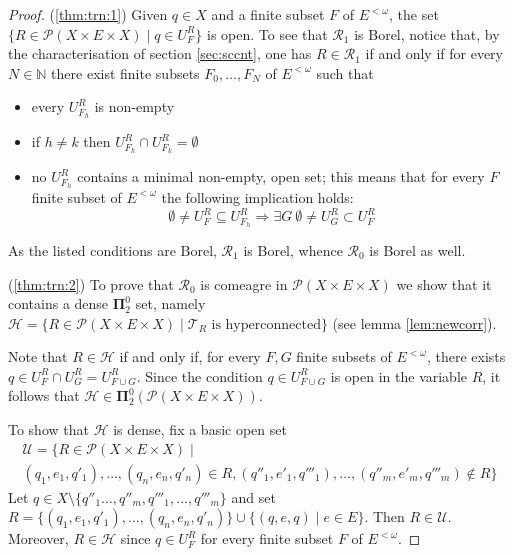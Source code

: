 \documentclass{lmcs}
\newcommand{\N}{\mathbb N}
\newcommand{\bpi}{\boldsymbol\Pi}
\begin{document}
\begin{proof}
(\ref{thm:trn:1})  Given $q\in X$ and a finite subset $F$ of $E^{<\omega }$, the set $\{ R\in \mathcal P (X\times E\times X)\mid q\in U_F^R\} $ is open.
To see that $ \mathcal R_1$ is Borel, notice that, by the characterisation of section \ref{sec:sccnt}, one has $R\in \mathcal R_1$ if and only if for every $N\in \N $ there exist finite subsets $F_0,\ldots ,F_N$ of $E^{<\omega }$ such that
\begin{itemize}
\item every $U_{F_h}^R$ is non-empty
\item if $h\ne k$ then $U_{F_h}^R\cap U_{F_k}^R=\emptyset $
\item no $U_{F_h}^R$ contains a minimal non-empty, open set; this means that for every $F$ finite subset of $E^{<\omega }$ the following implication holds:
\[
\emptyset\ne U_F^R\subseteq U_{F_h}^R\Rightarrow\exists G\ \emptyset\ne U_G^R\subset U_F^R
\]
\end{itemize}

As the listed conditions are Borel, $ \mathcal R_1$ is Borel, whence $ \mathcal R_0$ is Borel as well.

(\ref{thm:trn:2}) To prove that $ \mathcal R_0$ is comeagre in $ \mathcal P (X\times E\times X)$ we show that it contains a dense $ \bpi^0_2$ set, namely $ \mathcal H =\{ R\in \mathcal P (X\times E\times X)\mid \mathcal T_R \text{ is hyperconnected} \} $ (see lemma \ref{lem:newcorr}).

Note that $R\in \mathcal H $ if and only if, for every $F,G$ finite subsets of $E^{<\omega }$, there exists $q\in U_F^R\cap U_G^R=U_{F\cup G}^R$.
Since the condition $q\in U_{F\cup G}^R$ is open in the variable $R$, it follows that $ \mathcal H \in \bpi^0_2( \mathcal P (X\times E\times X))$.

To show that $ \mathcal H $ is dense, fix a basic open set
\[ \begin{array}{l}
\mathcal U =\{ R\in \mathcal P (X\times E\times X)\mid \\
(q_1,e_1,q'_1),\ldots ,(q_n,e_n,q'_n)\in R, (q''_1,e'_1,q'''_1),\ldots ,(q''_m,e'_m,q'''_m)\notin R\}
\end{array} \]
Let $q\in X\setminus\{ q''_1\ldots ,q''_m,q'''_1,\ldots ,q'''_m\} $ and set $R=\{ (q_1,e_1,q'_1),\ldots ,(q_n,e_n,q'_n)\}\cup\{ (q,e,q)\mid e\in E\} $.
Then $R\in \mathcal U $.
Moreover, $R\in \mathcal H$ since $q\in U_F^R$ for every finite subset $F$ of $E^{<\omega }$.
\end{proof}
\end{document}
